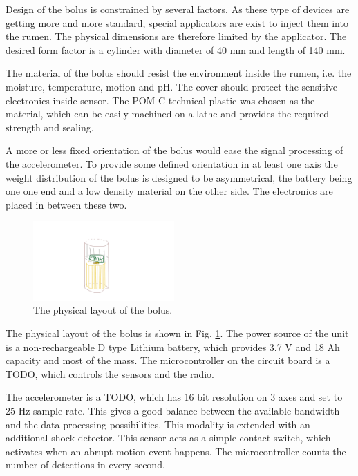 \documentclass[conference]{IEEEtran}
\begin{document}
Design of the bolus is constrained by several factors. As these type
of devices are getting more and more standard, special applicators are
exist to inject them into the rumen. The physical dimensions are therefore
limited by the applicator. The desired form factor is a cylinder with
diameter of 40 mm and length of 140 mm.

The material of the bolus should resist the environment inside the rumen,
i.e. the moisture, temperature, motion and pH. The cover should protect
the sensitive electronics inside sensor. The POM-C technical plastic was
chosen as the material, which can be easily machined on a lathe and provides
the required strength and sealing.

A more or less fixed orientation of the bolus would ease the signal
processing of the accelerometer. To provide some defined orientation
in at least one axis the weight distribution of the bolus is designed
to be asymmetrical, the battery being one one end and a low density
material on the other side. The electronics are placed in between these two.

\begin{figure}[htbp]
\centerline{\includegraphics[width=0.48\textwidth]{fig/bolus-physical-layout.png}}
\caption{The physical layout of the bolus.}
\label{bolus-physical-layout}
\end{figure}

The physical layout of the bolus is shown in Fig. \ref{bolus-physical-layout}.
The power source of the unit is a non-rechargeable D type Lithium battery,
which provides 3.7 V and 18 Ah capacity and most of the mass. The
microcontroller on the circuit board is a TODO, which controls the
sensors and the radio.

The accelerometer is a TODO, which has 16 bit resolution on 3 axes and
set to 25 Hz sample rate. This gives a good balance between the available
bandwidth and the data processing possibilities. This modality is extended
with an additional shock detector. This sensor acts as a simple contact switch,
which activates when an abrupt motion event happens. The microcontroller
counts the number of detections in every second.
\end{document}
